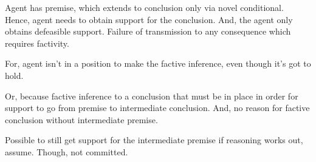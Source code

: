 \documentclass[10pt]{article}
\begin{document}
\begin{note}
  Agent has premise, which extends to conclusion only via novel conditional.
  Hence, agent needs to obtain support for the conclusion.
  And, the agent only obtains defeasible support.
  Failure of transmission to any consequence which requires factivity.

  For, agent isn't in a position to make the factive inference, even though it's got to hold.

  Or, because factive inference to a conclusion that must be in place in order for support to go from premise to intermediate conclusion.
  And, no reason for factive conclusion without intermediate premise.

  Possible to still get support for the intermediate premise if reasoning works out, assume.
  Though, not committed.
\end{note}
\end{document}
